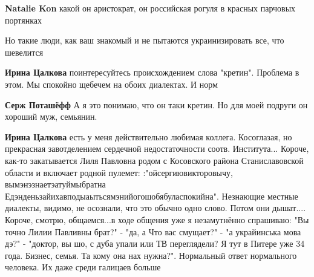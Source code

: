 \begin{itemize}
\begin{itemize}
\textbf{Natalie Kon} какой он аристократ, он российская рогуля в красных парчовых портянках


 
Но такие люди, как ваш знакомый и не пытаются украинизировать все, что шевелится

 
\textbf{Ирина Цалкова} поинтересуйтесь происхождением слова "кретин". Проблема в этом. Мы спокойно щебечем на обоих диалектах. И норм

 
\textbf{Серж Поташёфф} А я это понимаю, что он таки кретин. Но для моей подруги он хороший муж, семьянин.

 

\textbf{Ирина Цалкова} есть у меня действительно любимая коллега. Косоглазая, но
прекрасная завотделением сердечной недостаточности соотв. Института... Короче,
как-то закатывается Лиля Павловна родом с Косовского района Станиславовской
области и включает родной пулемет: :"ойсергиювикторовычу,
вымэнэзнаетэатуймыбратна Едэнденьзайихавподыаытьсямэнийогошобябуласпокийна".
Незнающие местные диалекты, видимо, не осознали, что это обычно одно слово.
Потом они дышат.... Короче, смотрю, общаемся...в ходе общения уже я
незамутнённо спрашиваю: "Вы точно Лилии Павливны брат?" - "да, а Что вас
смущает?" - "а украйинська мова дэ?" - "доктор, вы шо, с дуба упали или ТВ
переглядели? Я тут в Питере уже 34 года. Бизнес, семья. Та кому она нах
нужна?". Нормальный ответ нормального человека. Их даже среди галицаев больше



\end{itemize}
\end{itemize}
